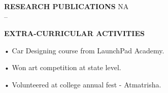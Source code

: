 \documentclass{article}
\begin{document}
\textbf{\LARGE RESEARCH PUBLICATIONS} \hspace{190pt}NA\\
--\vspace{10px}


\textbf{\LARGE EXTRA-CURRICULAR ACTIVITIES}
\begin{itemize}
	{\large \item •	Car Designing course from LaunchPad Academy. }
	{\large \item •	Won art competition at state level.}
	{\large \item •	Volunteered at college annual fest - Atmatrisha. }
\end{itemize}\vspace{15px}
	
\end{document}
